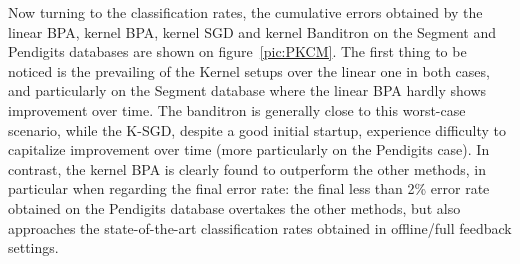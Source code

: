 \documentclass[preprint,12pt,authoryear]{elsarticle}
\begin{document}

	


Now turning to the classification rates, the cumulative errors obtained by the linear BPA, kernel BPA, kernel SGD and kernel Banditron on the Segment and Pendigits databases are shown on figure~\ref{pic:PKCM}. %
The first thing to be noticed is the prevailing of the Kernel setups over the linear one in both cases, and particularly on the Segment database where the linear BPA hardly shows improvement over time. 
 The banditron is generally close to this worst-case scenario, while the K-SGD, despite a good initial startup, experience difficulty to capitalize improvement over time (more particularly on the Pendigits case). In contrast, the kernel BPA is clearly found to outperform the other methods, in particular when regarding the final error rate: the final less than 2\% error rate obtained on the Pendigits database overtakes the other methods, but also approaches the state-of-the-art classification rates obtained in offline/full feedback settings. 


\end{document}
